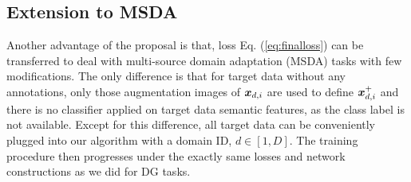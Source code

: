 \documentclass[10pt,twocolumn,letterpaper]{article}
\newcommand{\bx}{\mbox{\boldmath $x$}}
\newcommand{\0}{{\bf 0}}
\begin{document}
\subsection{Extension to MSDA}\label{sec:msda}
Another advantage of the proposal is that, loss Eq. (\ref{eq:finalloss}) can be transferred to deal with multi-source domain adaptation (MSDA) tasks with few modifications. The only difference is that for target data without any annotations, only those augmentation images of $\bx_{d,i}$ are used to define $\bx^+_{d,i}$ and there is no classifier applied on target data semantic features, as the class label is not available. Except for this difference, all target data can be conveniently plugged into our algorithm with a domain ID, $d \in [1,D]$. The training procedure then progresses under the exactly same losses and network constructions as we did for DG tasks.
\end{document}
